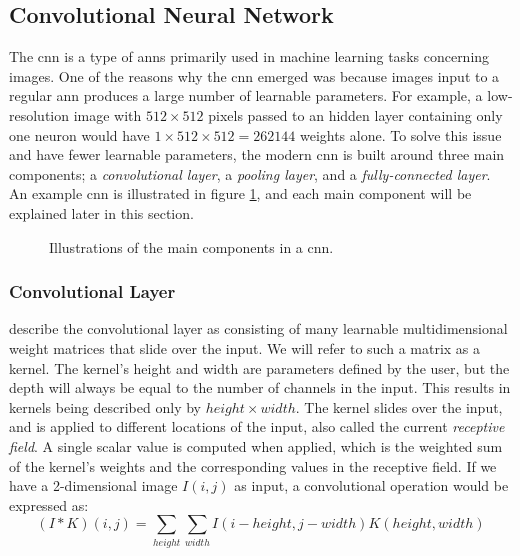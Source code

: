 \subsection{Convolutional Neural Network} \label{cnn}
    The \gls{cnn} is a type of \gls{ann}s primarily used in machine learning tasks concerning images\cite{o2015introduction_convolutions}. One of the reasons why the \gls{cnn} emerged was because images input to a regular \gls{ann} produces a large number of learnable parameters. For example, a low-resolution image with $512\times512$ pixels passed to an hidden layer containing only one neuron would have $1\times512\times512 = 262144$ weights alone.  To solve this issue and have fewer learnable parameters, the modern \gls{cnn} is built around three main components\cite{o2015introduction_convolutions}; a \textit{convolutional layer}, a \textit{pooling layer}, and a \textit{fully-connected layer}. An example \gls{cnn} is illustrated in figure \ref{convolutional_neural_network_fig}, and each main component will be explained later in this section.

    \begin{figure}[H]
        \centering
                        
        \caption[Convolutional neural network example]{Illustrations of the main components in a \gls{cnn}.}
      	\medskip 
        \label{convolutional_neural_network_fig}
    \end{figure}



    \subsubsection{Convolutional Layer}
    
    
     \citeauthor{o2015introduction_convolutions}\cite{o2015introduction_convolutions} describe the convolutional layer as consisting of many learnable multidimensional weight matrices that slide over the input. We will refer to such a matrix as a kernel. The kernel's height and width are parameters defined by the user, but the depth will always be equal to the number of channels in the input. This results in kernels being described only by $height \times width$. The kernel slides over the input, and is applied to different locations of the input, also called the current \textit{receptive field}. A single scalar value is computed when applied, which is the weighted sum of the kernel's weights and the corresponding values in the receptive field. If we have a 2-dimensional image $I(i,j)$ as input, a convolutional operation would be expressed as\cite{Goodfellow-et-al-2016}:
        \begin{equation}
            (I*K)(i,j) = \sum_{height}\sum_{width}I(i-height,j-width)K(height,width)
        \end{equation}
     
